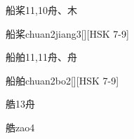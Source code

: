\begin{Entry}{船桨}{11,10}{⾈、⽊}
  \begin{Phonetics}{船桨}{chuan2jiang3}[][HSK 7-9]
  \end{Phonetics}
\end{Entry}

\begin{Entry}{船舶}{11,11}{⾈、⾈}
  \begin{Phonetics}{船舶}{chuan2bo2}[][HSK 7-9]
  \end{Phonetics}
\end{Entry}

\begin{Entry}{艁}{13}{⾈}
  \begin{Phonetics}{艁}{zao4}
  \end{Phonetics}
\end{Entry}



